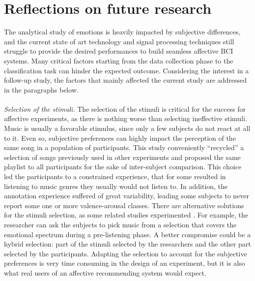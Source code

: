 \section{Reflections on future research}
\label{sec:future_research}
The analytical study of emotions is heavily impacted by subjective differences, and the current state of art technology and signal processing techniques still struggle to provide the desired performances to build seamless affective \ac{BCI} systems. Many critical factors starting from the data collection phase to the classification task can hinder the expected outcome. Considering the interest in a follow-up study, the factors that mainly affected the current study are addressed in the paragraphs below. 
\\
\\
\emph{Selection of the stimuli.} The selection of the stimuli is critical for the success for affective experiments, as there is nothing worse than selecting ineffective stimuli. Music is usually a favorable stimulus, since only a few subjects do not react at all to it. Even so, subjective preferences can highly impact the perception of the same song in a population of participants. This study conveniently “recycled” a selection of songs previously used in other experiments and proposed the same playlist to all participants for the sake of inter-subject comparison. This choice led the participants to a constrained experience, that for some resulted in listening to music genres they usually would not listen to. In addition, the annotation experience suffered of great variability, leading some subjects to never report some one or more valence-arousal classes. There are alternative solutions for the stimuli selection, as some related studies experimented \cite{thammasan_continuous_2016}. For example, the researcher can ask the subjects to pick music from a selection that covers the emotional spectrum during a pre-listening phase. A better compromise could be a hybrid selection: part of the stimuli selected by the researchers and the other part selected by the participants. Adapting the selection to account for the subjective preferences is very time consuming in the design of an experiment, but it is also what real users of an affective recommending system would expect.
\\
\\
